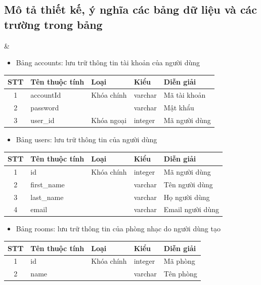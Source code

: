 \documentclass[a4paper]{article}
\begin{document}
\subsection{Mô tả thiết kế, ý nghĩa các bảng dữ liệu và các trường trong bảng}
    \begin{picture}
   \end{picture}&
\begin{itemize}
    \item Bảng accounts: lưu trữ thông tin tài khoản của người dùng
\end{itemize}
\begin{tabular}{cllll}
\toprule
  STT & Tên thuộc tính  & Loại & Kiểu & Diễn giải   \\
  \midrule
    1    & accountId  & Khóa chính & varchar & Mã tài khoản \\
  2  & password   &  & varchar & Mật khẩu \\
 3   & user\_id & Khóa ngoại & integer & Mã người dùng\\
   \bottomrule
\end{tabular}

\begin{itemize}
    \item Bảng users: lưu trữ thông tin của người dùng
\end{itemize}
\begin{tabular}{cllll}
\toprule
  STT & Tên thuộc tính  & Loại & Kiểu & Diễn giải   \\
  \midrule
    1    & id  & Khóa chính & integer & Mã người dùng \\
  2  & first\_name   &  & varchar & Tên người dùng \\
 3   & last\_name &  & varchar & Họ người dùng\\
 4 & email &  & varchar & Email người dùng \\
   \bottomrule
\end{tabular}

\begin{itemize}
    \item Bảng rooms: lưu trữ thông tin của phòng nhạc do người dùng tạo
\end{itemize}
\begin{tabular}{cllll}
\toprule
  STT & Tên thuộc tính  & Loại & Kiểu & Diễn giải   \\
  \midrule
    1    & id  & Khóa chính & integer & Mã phòng \\
  2  & name   &  & varchar & Tên phòng \\
   \bottomrule
\end{tabular}
\end{document}
